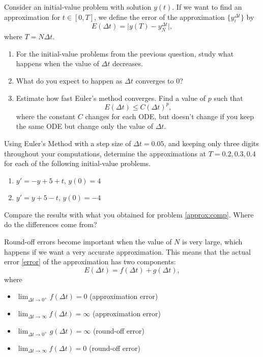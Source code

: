 \begin{exercises}
\begin{problist}
	
	
	
	
	
	
	
	
	
	
	\prob Consider an initial-value problem with solution $y(t)$. If we want to find an approximation for $t \in [0,T]$, we define the error of the approximation $\{y^{\Delta t}_i\}$ by
	\begin{equation}\tag{E}\label{error} 
		E(\Delta t) = \big| y(T) - y^{\Delta t}_N \big|,
	\end{equation}
	where $T = N \Delta t$.
	
	\begin{enumerate}
		\item For the initial-value problems from the previous question, study what happens when the value of $\Delta t$ decreases.
		\item What do you expect to happen as $\Delta t$ converges to $0$?
		\item Estimate how fast Euler's method converges. Find a value of $p$ such that
			$$ E(\Delta t) \leq C (\Delta t)^p,$$
		where the constant $C$ changes for each ODE, but doesn't change if you keep the same ODE but change only the value of $\Delta t$.
	\end{enumerate}
	

	\prob Using Euler's Method with a step size of $\Delta t = 0.05$, and keeping only three digits throughout your computations, determine the approximations at $T=0.2, 0.3, 0.4$ for each of the following initial-value problems.
	\begin{enumerate}
		\item $y'=-y+5+t$, $y(0) = 4$
		\item $y'=y+5-t$, $y(0) = -4$
	\end{enumerate}
	Compare the results with what you obtained for problem \ref{approx:comp}. Where do the differences come from?
	
	\prob Round-off errors become important when the value of $N$ is very large, which happens if we want a very accurate approximation. This means that the actual error \eqref{error} of the approximation has two components:
	$$ E(\Delta t) = f(\Delta t) + g(\Delta t), $$
	where
	\begin{itemize}
		\item $\displaystyle \lim_{\Delta t \to 0^+} f(\Delta t) = 0$ \hfill (approximation error)
		\item $\displaystyle \lim_{\Delta t \to \infty} f(\Delta t) = \infty$ \hfill (approximation error)
		\item $\displaystyle \lim_{\Delta t \to 0^+} g(\Delta t) = \infty$ \hfill (round-off error)
		\item $\displaystyle \lim_{\Delta t \to \infty} f(\Delta t) = 0$ \hfill (round-off error)
	\end{itemize}
	

\end{problist}
\end{exercises}
